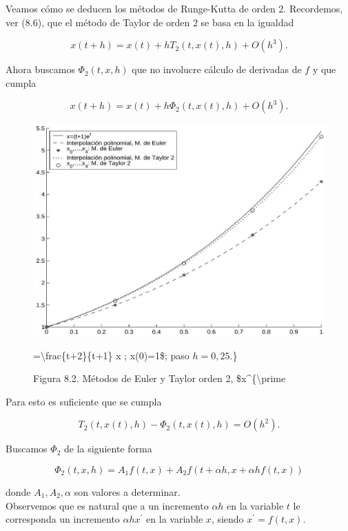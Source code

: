 \documentclass[10pt]{article}
\begin{document}
Veamos cómo se deducen los métodos de Runge-Kutta de orden 2. Recordemos, ver (8.6), que el método de Taylor de orden 2 se basa en la igualdad

$$
x(t+h)=x(t)+h T_{2}(t, x(t), h)+O\left(h^{3}\right) .
$$

Ahora buscamos $\Phi_{2}(t, x, h)$ que no involucre cálculo de derivadas de $f$ y que cumpla

$$
x(t+h)=x(t)+h \Phi_{2}(t, x(t), h)+O\left(h^{3}\right) .
$$

\begin{figure}[h]
\begin{center}
  \includegraphics[width=\textwidth]{2025_09_05_3888c9ac96bd653d96b4g-179}
\captionsetup{labelformat=empty}
\caption{Figura 8.2. Métodos de Euler y Taylor orden 2, \$x\^{}\{\textbackslash prime}=\textbackslash frac\{t+2\}\{t+1\} x ; x(0)=1\$; paso $h=0,25$.\}\end{center}
\end{figure}

Para esto es suficiente que se cumpla


\begin{equation*}
T_{2}(t, x(t), h)-\Phi_{2}(t, x(t), h)=O\left(h^{2}\right) . \tag{8.9}
\end{equation*}


Buscamos $\Phi_{2}$ de la siguiente forma


\begin{equation*}
\Phi_{2}(t, x, h)=A_{1} f(t, x)+A_{2} f(t+\alpha h, x+\alpha h f(t, x)) \tag{8.10}
\end{equation*}


donde $A_{1}, A_{2}, \alpha$ son valores a determinar.\\
Observemos que es natural que a un incremento $\alpha h$ en la variable $t$ le corresponda un incremento $\alpha h x^{\prime}$ en la variable $x$, siendo $x^{\prime}=f(t, x)$.
\end{document}
